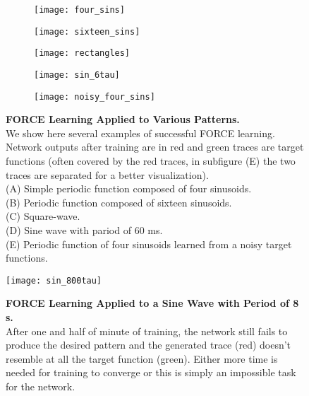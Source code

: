 \begin{figure}[H]
  \centering
  \begin{minipage}{0.66\textwidth}
  \begin{subfigure}{0.5\textwidth}
    \centering
    \texttt{[image: four\_sins]}
  \end{subfigure}
  \begin{subfigure}{0.5\textwidth}
    \centering
    \texttt{[image: sixteen\_sins]}
  \end{subfigure}
  \begin{subfigure}{0.5\textwidth}
    \centering
    \texttt{[image: rectangles]}
  \end{subfigure}
  \begin{subfigure}{0.5\textwidth}
    \centering
    \texttt{[image: sin\_6tau]}
  \end{subfigure}
  \end{minipage}
  \begin{subfigure}{0.32\textwidth}
    \centering
    \texttt{[image: noisy\_four\_sins]}
  \end{subfigure}
  \caption{
    \textbf{FORCE Learning Applied to Various Patterns.}\\[0.1em]
    We show here several examples of successful FORCE learning. 
    Network outputs after training are
    in red and green traces are target functions (often covered by
    the red traces, in subfigure (E) the two traces are separated 
    for a better visualization).\\[0.1em]
    (A) Simple periodic function composed of four sinusoids.\\[0.1em]
    (B) Periodic function composed of sixteen sinusoids.\\[0.1em]
    (C) Square-wave.\\[0.1em]
    (D) Sine wave with pariod of 60 ms.\\[0.1em]
    (E) Periodic function of four sinusoids learned from a noisy target
    functions.
  }
  \label{fig: patterns}
\end{figure}

\vfill

\begin{figure}[H]
  \centering
  \texttt{[image: sin\_800tau]}
  \caption{
    \textbf{FORCE Learning Applied to a Sine Wave with Period of 8 s.}
    \\[0.1em]
    After one and half of minute of training, the network still
    fails to produce the desired pattern and the generated trace (red)
    doesn't resemble at all the target function (green).
    Either more time is needed for training to converge or this is simply
    an impossible task for the network.
  }
  \label{fig: sin_8s}
\end{figure}
\vfill


